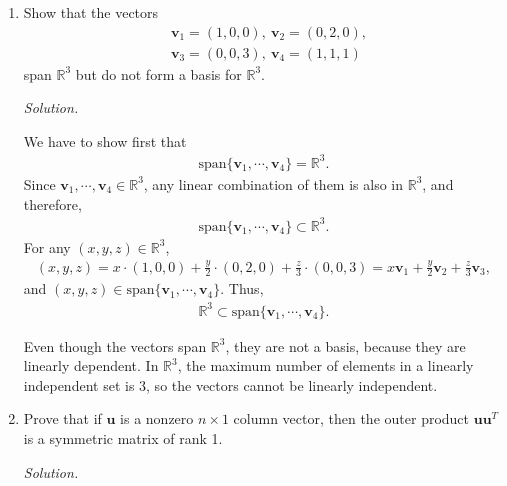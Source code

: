 \documentclass{article}
\begin{document}
\begin{enumerate}
\begin{enumerate}
\end{enumerate}

\item Show that the vectors
	\begin{align*}
	&\mathbf{v}_1=(1,0,0),~\mathbf{v}_2=(0,2,0),\\
	&\mathbf{v}_3=(0,0,3),~\mathbf{v}_4=(1,1,1)
	\end{align*}
span $\mathbb{R}^3$ but do not form a basis for $\mathbb{R}^3$.

\emph{Solution.}

We have to show first that
	\begin{align*}
	\text{span}\{\mathbf{v}_1,\cdots,\mathbf{v}_4\}=\mathbb{R}^3.	
	\end{align*}
Since $\mathbf{v}_1,\cdots,\mathbf{v}_4\in\mathbb{R}^3$, any linear combination of them is also in $\mathbb{R}^3$, and therefore, 
	\begin{align*}
	\text{span}\{\mathbf{v}_1,\cdots,\mathbf{v}_4\}\subset \mathbb{R}^3.	
	\end{align*}
For any $(x,y,z)\in\mathbb{R}^3$,
	\begin{align*}
	(x,y,z)=x\cdot(1,0,0)+ \frac{y}{2}\cdot(0,2,0)+\frac{z}{3}\cdot(0,0,3)
	=x\mathbf{v}_1+\frac{y}{2}\mathbf{v}_2+\frac{z}{3}\mathbf{v}_3,	
	\end{align*}
and $(x,y,z)\in\text{span}\{\mathbf{v}_1,\cdots,\mathbf{v}_4\}$. Thus,
	\begin{align*}
	 \mathbb{R}^3 \subset \text{span}\{\mathbf{v}_1,\cdots,\mathbf{v}_4\}.
	\end{align*}

Even though the vectors span $\mathbb{R}^3$, they are not a basis, because they are linearly dependent.
In $\mathbb{R}^3$, the maximum number of elements in a linearly independent set is 3, so the vectors cannot be linearly independent.

\item
Prove that if $\mathbf{u}$ is a nonzero $n\times 1 $ column vector, then the outer product $\mathbf{u}\mathbf{u}^T$ is a symmetric matrix of rank 1.

\emph{Solution.}


\end{enumerate}
\end{document}
